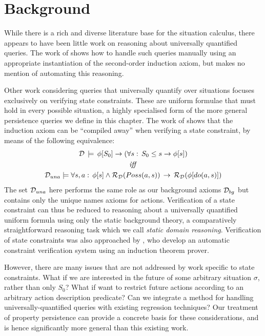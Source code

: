 \section{Background\label{sec:Persistence:Background}}

While there is a rich and diverse literature base for the situation
calculus, there appears to have been little work on reasoning about
universally quantified queries. The work of \citet{Reiter93proving}
shows how to handle such queries manually using an appropriate instantiation
of the second-order induction axiom, but makes no mention of automating
this reasoning.

Other work considering queries that universally quantify over situations
focuses exclusively on verifying state constraints. These are uniform
formulae that must hold in every possible situation, a highly specialised
form of the more general persistence queries we define in this chapter.
The work of \citet{Lin94-StateConstraints} shows that the induction
axiom can be {}``compiled away'' when verifying a state constraint,
by means of the following equivalence:\begin{gather*}
\mathcal{D}\,\models\,\phi[S_{0}]\rightarrow\left(\forall s:\, S_{0}\leq s\rightarrow\phi[s]\right)\\
\mathit{iff}\\
\mathcal{D}_{una}\models\forall s,a:\,\phi[s]\wedge\mathcal{R}_{\mathcal{D}}(Poss(a,s))\,\rightarrow\,\mathcal{R}_{\mathcal{D}}(\phi[do(a,s)])\end{gather*}
 The set $\mathcal{D}_{una}$ here performs the same role as our background
axioms $\mathcal{D}_{bg}$ but contains only the unique names axioms for actions.
Verification of a state constraint can thus be reduced to reasoning
about a universally quantified uniform formula using only the static
background theory, a comparatively straightforward reasoning task
which we call \emph{static domain reasoning}. Verification of state
constraints was also approached by \citet{bertossi96automating},
who develop an automatic constraint verification system using an induction
theorem prover.

However, there are many issues that are not addressed by work specific
to state constraints. What if we are interested in the future of some
arbitrary situation $\sigma$, rather than only $S_{0}$? What if
want to restrict future actions according to an arbitrary action description
predicate? Can we integrate a method for handling universally-quantified
queries with existing regression techniques? Our treatment of property
persistence can provide a concrete basis for these considerations,
and is hence significantly more general than this existing work.

